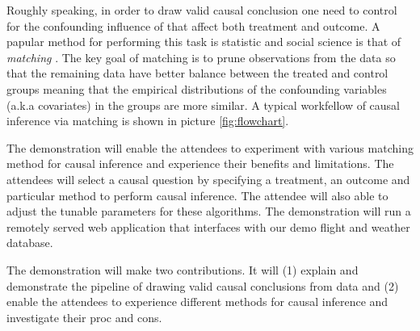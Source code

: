 \vspace{-2mm}
Roughly speaking, in order to draw valid causal conclusion one need to control for the
confounding influence of that affect both treatment and outcome. A papular method for 
performing this task is statistic and social science is that of {\em matching} \cite{IacKinPor09}.
The key goal of matching is to prune observations from the data so that
the remaining data have better balance between the treated and control groups meaning that the empirical
distributions of the confounding variables (a.k.a covariates) in the groups are more similar. A typical workfellow of causal inference via matching is shown in picture \ref{fig:flowchart}. 

The demonstration will enable the attendees to experiment with various matching method for causal inference and experience their benefits and limitations.
The attendees will select a causal question by specifying a treatment,
  an outcome and particular method to perform causal inference.
The attendee will also able to adjust the tunable parameters for these algorithms.
The demonstration will run a remotely served web application that interfaces with our demo flight and weather database.

The demonstration will make two contributions. It will
  (1) explain and demonstrate the pipeline of drawing valid causal conclusions from data and
  (2) enable the attendees to experience different methods for causal inference and investigate their proc and cons.
